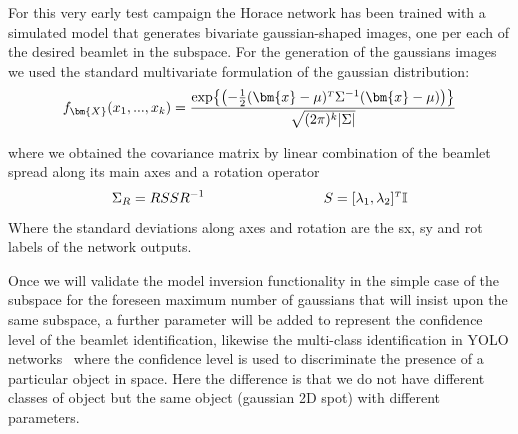 For this very early test campaign the Horace network has been trained with a simulated model that generates bivariate gaussian-shaped images, one per each of the desired beamlet in the subspace. For the generation of the gaussians images we used the standard multivariate formulation of the gaussian distribution:
\begin{equation}
    f_{\bm{X}}(x_1, ... ,x_k) = 
    \frac{\exp{\left( -\frac{1}{2}\transpose{(\bm{x}-\mu)} \Sigma^{-1} (\bm{x}-\mu) \right)}}
         {\sqrt{(2\pi)^k |\Sigma|}}
\end{equation}

where we obtained the covariance matrix by linear combination of the beamlet spread along its main axes and a rotation operator
\begin{equation}
    \Sigma_R = R SS R^{-1}   \hspace{3cm}   S=\transpose{[\lambda_1,\lambda_2]}\mathbb{I}
\end{equation}
Where the standard deviations along axes and rotation are the sx, sy and rot labels of the network outputs.

Once we will validate the model inversion functionality in the simple case of the subspace for the foreseen maximum number of gaussians that will insist upon the same subspace, a further parameter will be added to represent the confidence level of the beamlet identification, likewise the multi-class identification in YOLO networks~\cite{YOLOv3} where the confidence level is used to discriminate the presence of a particular object in space. Here the difference is that we do not have different classes of object but the same object (gaussian 2D spot) with different parameters.


